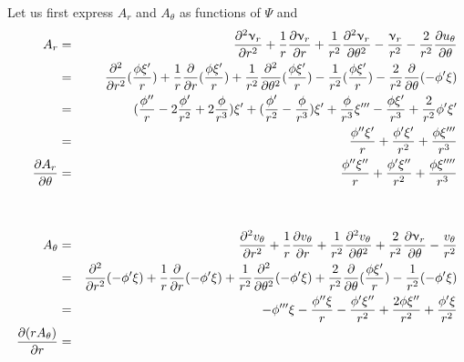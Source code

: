 Let us first express $A_r$ and $A_\theta$ as functions of $\Psi$
and 
\begin{eqnarray}
A_r 
&=& 
\frac{\partial^2 \upnu_r}{\partial r^2} 
+ \frac{1}{r} \frac{\partial \upnu_r}{\partial r} +   
\frac{1}{r^2} \frac{\partial^2 \upnu_r}{\partial \theta^2}
- \frac{\upnu_r}{r^2} 
- \frac{2}{r^2} \frac{\partial u_\theta}{\partial \theta} \nonumber\\ 
&=& 
\frac{\partial^2 }{\partial r^2}  (\frac{\phi \xi'}{r})
+ \frac{1}{r} \frac{\partial }{\partial r}  (\frac{\phi \xi'}{r})  
+\frac{1}{r^2} \frac{\partial^2 }{\partial \theta^2}(\frac{\phi \xi'}{r})
- \frac{1}{r^2} (\frac{\phi \xi'}{r})
- \frac{2}{r^2} \frac{\partial }{\partial \theta} (-\phi' \xi) \nonumber\\
&=& 
(\frac{\phi''}{r} - 2\frac{\phi'}{r^2} +  2\frac{\phi}{r^3} )\xi'
+ (\frac{\phi'}{r^2} - \frac{\phi}{r^3} )  \xi' 
+\frac{\phi }{r^3} \xi'''  
-  \frac{\phi \xi'}{r^3}
+ \frac{2}{r^2} \phi' \xi' \nonumber\\
&=&
\frac{\phi'' \xi'}{r} + \frac{\phi' \xi'}{r^2} + \frac{\phi\xi''' }{r^3} \nonumber\\
\frac{\partial A_r}{\partial \theta} &=& 
\frac{\phi'' \xi''}{r} + \frac{\phi' \xi''}{r^2} + \frac{\phi\xi'''' }{r^3} \nonumber\\
\nonumber\\
\nonumber\\
A_\theta 
&=&
\frac{\partial^2 v_\theta}{\partial r^2} 
+ \frac{1}{r} \frac{\partial v_\theta}{\partial r} 
+ \frac{1}{r^2} \frac{\partial^2 v_\theta}{\partial \theta^2}
+\frac{2}{r^2} \frac{\partial \upnu_r}{\partial \theta} 
- \frac{v_\theta}{r^2} \nonumber\\
&=&
\frac{\partial^2 }{\partial r^2}(-\phi' \xi) 
+ \frac{1}{r} \frac{\partial }{\partial r} (-\phi' \xi)
+ \frac{1}{r^2} \frac{\partial^2 }{\partial \theta^2}(-\phi' \xi)
+\frac{2}{r^2} \frac{\partial }{\partial \theta} (\frac{\phi \xi'}{r})
- \frac{1}{r^2} (-\phi' \xi) \nonumber\\
&=& - \phi''' \xi 
- \frac{\phi'' \xi}{r} 
- \frac{\phi' \xi''}{r^2} 
+\frac{2 \phi \xi''}{r^2} 
+  \frac{\phi' \xi}{r^2} \nonumber\\
\frac{\partial (r A_\theta)}{\partial r} &=& 
\end{eqnarray}






\newpage

